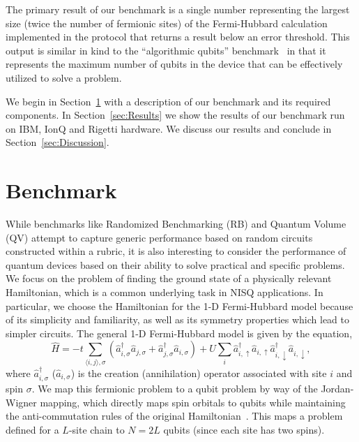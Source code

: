 \documentclass[
prx,
superscriptaddress,
twocolumn,
longbibliography
]{revtex4-1}
\begin{document}
The primary result of our benchmark is a single number representing the largest size (twice the number of fermionic sites) of the Fermi-Hubbard calculation implemented in the protocol that returns a result below an error threshold. This output is similar in kind to the ``algorithmic qubits'' benchmark~\cite{ionq_alg} in that it represents the maximum number of qubits in the device that can be effectively utilized to solve a problem. 

We begin in Section~\ref{sec:Benchmark} with a description of our benchmark and its required components. In Section~\ref{sec:Results} we show the results of our benchmark run on IBM, IonQ and Rigetti hardware. We discuss our results and conclude in Section~\ref{sec:Discussion}.

\section{Benchmark}
\label{sec:Benchmark}
While benchmarks like Randomized Benchmarking (RB) and Quantum Volume (QV) attempt to capture generic performance based on random circuits constructed within a rubric, it is also interesting to consider the performance of quantum devices based on their ability to solve practical and specific problems. We focus on the problem of finding the ground state of a physically relevant Hamiltonian, which is a common underlying task in NISQ applications. In particular, we choose the Hamiltonian for the 1-D Fermi-Hubbard model because of its simplicity and familiarity, as well as its symmetry properties which lead to simpler circuits. The general 1-D Fermi-Hubbard model is given by the equation,
\begin{equation}
    \hat{H}=-t\sum_{\langle i,j\rangle, \sigma} (\hat{a}_{i,\sigma}^\dagger\hat{a}_{j,\sigma} +\hat{a}_{j,\sigma}^\dagger\hat{a}_{i,\sigma} ) + U \sum_i \hat{a}_{i,\uparrow}^\dagger\hat{a}_{i,\uparrow}\hat{a}_{i,\downarrow}^\dagger\hat{a}_{i,\downarrow},
\label{eq:FH}
\end{equation}
where $\hat{a}_{i,\sigma}^\dagger$ ($\hat{a}_{i,\sigma}$) is the creation (annihilation) operator associated with site $i$ and spin $\sigma$. We map this fermionic problem to a qubit problem by way of the Jordan-Wigner mapping, which directly maps spin orbitals to qubits while maintaining the anti-commutation rules of the original Hamiltonian~\cite{PhysRevLett.63.322}. This maps a problem defined for a $L$-site chain to $N=2L$ qubits (since each site has two spins). 
\end{document}
